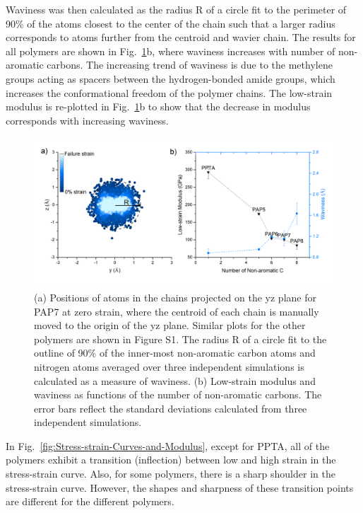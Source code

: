 \documentclass[journal=langd5,manuscript=article]{achemso}
\begin{document}
Waviness was then calculated as the radius R of a circle fit to the perimeter of 90\% of the atoms closest to the center of the chain such that a larger radius corresponds to atoms further from the centroid and wavier chain.
The results for all polymers are shown in Fig.~\ref{fig:SideView-Waviness-and-Low-strain-Modulus}b, where waviness increases with number of non-aromatic carbons.
The increasing trend of waviness is due to the methylene groups acting as spacers between the hydrogen-bonded amide groups, which increases the conformational freedom of the polymer chains.
The low-strain modulus is re-plotted in Fig.~\ref{fig:SideView-Waviness-and-Low-strain-Modulus}b to show that the decrease in modulus corresponds with increasing waviness.

\begin{figure}[h!]
\centering
\includegraphics[scale=0.55]{SideView-Waviness-and-Low-strain-Modulus.png}
\caption{(a) Positions of atoms in the chains projected on the yz plane for PAP7 at zero strain, where the centroid of each chain is manually moved to the origin of the yz plane. Similar plots for the other polymers are shown in Figure S1. The radius R of a circle fit to the outline of 90\% of the inner-most non-aromatic carbon atoms and nitrogen atoms averaged over three independent simulations is calculated as a measure of waviness. (b) Low-strain modulus and waviness as functions of the number of non-aromatic carbons. The error bars reflect the standard deviations calculated from three independent simulations.}
\label{fig:SideView-Waviness-and-Low-strain-Modulus}
\end{figure}

In Fig.~\ref{fig:Stress-strain-Curves-and-Modulus}, except for PPTA, all of the polymers exhibit a transition (inflection) between low and high strain in the stress-strain curve.
Also, for some polymers, there is a sharp shoulder in the stress-strain curve.
However, the shapes and sharpness of these transition points are different for the different polymers.
\end{document}
